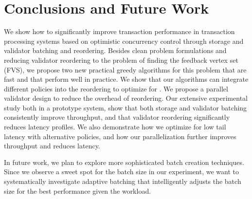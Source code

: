 \section{Conclusions and Future Work}\label{sec:conclusion}

We show how to significantly improve transaction performance in transaction processing systems based on optimistic concurrency control through storage and validator batching and reordering. Besides clean problem formulations and
reducing validator reordering to the problem of finding the  feedback vertex set (FVS), we propose two new practical greedy algorithms for this problem
that are fast and that perform well in practice. We show that our algorithms can integrate different policies into the reordering to optimize for . We  propose a parallel validator design to reduce the overhead of reordering. Our extensive experimental study both in a prototype system,  show that both storage and validator batching consistently improve throughput, and that validator reordering 
significantly reduces latency profiles. We also demonstrate how we optimize for low tail latency with alternative policies, and how our parallelization further improves
throughput and reduces latency.

In future work, we plan to explore more sophisticated batch creation techniques. Since we observe a sweet spot for the  batch size in our experiment, we want to systematically investigate adaptive batching that intelligently adjusts the batch size for the best performance given the workload. 
